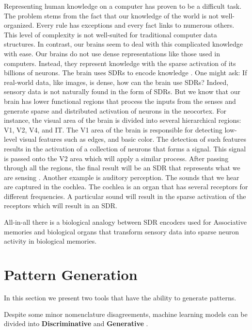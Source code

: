 \documentclass[runningheads]{llncs}
\begin{document}
Representing human knowledge on a computer has proven to be a difficult task. The problem stems from the fact that our knowledge of the world is not well-organized. Every rule has exceptions and every fact links to numerous others. This level of complexity is not well-suited for traditional computer data structures. In contrast, our brains seem to deal with this complicated knowledge with ease. Our brains do not use dense representations like those used in computers. Instead, they represent knowledge with the sparse activation of its billions of neurons. The brain uses SDRs to encode knowledge \cite{Hawkins-et-al-2016-Book}. One might ask: If real-world data, like images, is dense, how can the brain use SDRs? Indeed, sensory data is not naturally found in the form of SDRs. But we know that our brain has lower functional regions that process the inputs from the senses and generate sparse and distributed activation of neurons in the neocortex. For instance, the visual area of the brain is divided into several hierarchical regions: V1, V2, V4, and IT. The V1 area of the brain is responsible for detecting low-level visual features such as edges, and basic color. The detection of such features results in the activation of a collection of neurons that forms a signal. This signal is passed onto the V2 area which will apply a similar process. After passing through all the regions, the final result will be an SDR that represents what we are sensing \cite{hawkins2004intelligence}. Another example is auditory perception. The sounds that we hear are captured in the cochlea. The cochlea is an organ that has several receptors for different frequencies. A particular sound will result in the sparse activation of the receptors which will result in an SDR.

All-in-all there is a biological analogy between SDR encoders used for Associative memories and biological organs that transform sensory data into sparse neuron activity in biological memories.

\section{Pattern Generation}
\label{sec:gen}
In this section we present two tools that have the ability to generate patterns.

Despite some minor nomenclature disagreements, machine learning models can be divided into \textbf{Discriminative} and \textbf{Generative} \cite{ng2002discriminative,kingma2019introduction}. 
\end{document}

